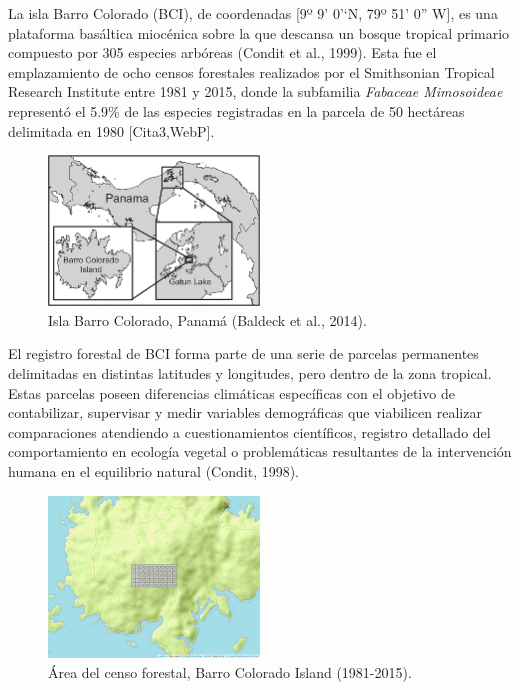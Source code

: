 \documentclass[11pt,]{article}
\begin{document}
La isla Barro Colorado (BCI), de coordenadas {[}9º 9' 0'`N, 79º 51' 0''
W{]}, es una plataforma basáltica miocénica sobre la que descansa un
bosque tropical primario compuesto por 305 especies arbóreas (Condit et
al., 1999). Esta fue el emplazamiento de ocho censos forestales
realizados por el Smithsonian Tropical Research Institute entre 1981 y
2015, donde la subfamilia \emph{Fabaceae Mimosoideae} representó el
5.9\% de las especies registradas en la parcela de 50 hectáreas
delimitada en 1980 {[}Cita3,WebP{]}.

\begin{figure}
\centering
\includegraphics[width=0.50000\textwidth]{Map-of-Barro-Colorado-Island-BCI-Panama.png}
\caption{Isla Barro Colorado, Panamá (Baldeck et al., 2014).}
\end{figure}

El registro forestal de BCI forma parte de una serie de parcelas
permanentes delimitadas en distintas latitudes y longitudes, pero dentro
de la zona tropical. Estas parcelas poseen diferencias climáticas
específicas con el objetivo de contabilizar, supervisar y medir
variables demográficas que viabilicen realizar comparaciones atendiendo
a cuestionamientos científicos, registro detallado del comportamiento en
ecología vegetal o problemáticas resultantes de la intervención humana
en el equilibrio natural (Condit, 1998).

\begin{figure}
\centering
\includegraphics[width=0.50000\textwidth]{mapa_cuadros.png}
\caption{Área del censo forestal, Barro Colorado Island (1981-2015).}
\end{figure}
\end{document}

